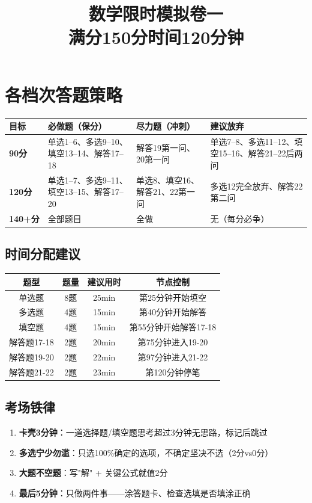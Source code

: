 \documentclass[12pt,a4paper]{ctexart}
\title{\textbf{数学限时模拟卷一}\\[5pt]\large 满分150分\quad 时间120分钟}
\date{}
\begin{document}
\maketitle

\section*{各档次答题策略}

\begin{center}
\begin{tabular}{p{2.5cm}|p{4cm}|p{4cm}|p{4cm}}
\textbf{目标} & \textbf{必做题（保分）} & \textbf{尽力题（冲刺）} & \textbf{建议放弃} \\ \hline
\textbf{90分} & 单选1--6、多选9--10、填空13--14、解答17--18 & 解答19第一问、20第一问 & 单选7--8、多选11--12、填空15--16、解答21--22后两问 \\ \hline
\textbf{120分} & 单选1--7、多选9--11、填空13--15、解答17--20 & 单选8、填空16、解答21、22第一问 & 多选12完全放弃、解答22第二问 \\ \hline
\textbf{140+分} & 全部题目 & 全做 & 无（每分必争） \\
\end{tabular}
\end{center}

\subsection*{时间分配建议}
\begin{center}
\begin{tabular}{c|c|c|c}
\textbf{题型} & \textbf{题量} & \textbf{建议用时} & \textbf{节点控制} \\ \hline
单选题 & 8题 & 25min & 第25分钟开始填空 \\
多选题 & 4题 & 15min & 第40分钟开始解答 \\
填空题 & 4题 & 15min & 第55分钟开始解答17-18 \\
解答题17-18 & 2题 & 20min & 第75分钟进入19-20 \\
解答题19-20 & 2题 & 22min & 第97分钟进入21-22 \\
解答题21-22 & 2题 & 23min & 第120分钟停笔 \\
\end{tabular}
\end{center}

\subsection*{考场铁律}
\begin{enumerate}
  \item \textbf{卡壳3分钟}：一道选择题/填空题思考超过3分钟无思路，标记后跳过
  \item \textbf{多选宁少勿滥}：只选100\%确定的选项，不确定坚决不选（2分vs0分）
  \item \textbf{大题不空题}：写"解" + 关键公式就值2分
  \item \textbf{最后5分钟}：只做两件事——涂答题卡、检查选填是否填涂正确
\end{enumerate}
\end{document}
